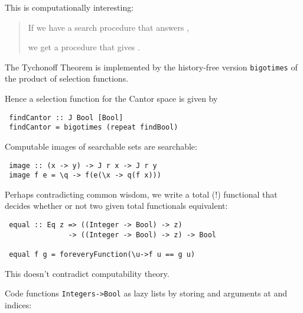 \documentclass%
[%
Screen4to3,
]{foils}
\begin{document}

\begin{quote}
\end{quote}

This is computationally interesting:
\begin{quote}
  If we have a search procedure that answers 
  ,

  we get a procedure that gives  .
\end{quote}


The Tychonoff Theorem is
implemented by the history-free version \verb+bigotimes+ of the
product of selection functions. 

\vfill

Hence a selection function for the
Cantor space is given by
\begin{verbatim}
 findCantor :: J Bool [Bool]
 findCantor = bigotimes (repeat findBool)
\end{verbatim}


Computable images of searchable sets are searchable:
\begin{verbatim}
 image :: (x -> y) -> J r x -> J r y
 image f e = \q -> f(e(\x -> q(f x)))
\end{verbatim}


Perhaps contradicting common wisdom, we write a
total (!) functional that decides whether or not two given total
functionals equivalent:

\vfill

\begin{verbatim}
 equal :: Eq z => ((Integer -> Bool) -> z) 
               -> ((Integer -> Bool) -> z) -> Bool 

 equal f g = foreveryFunction(\u->f u == g u)
\end{verbatim}

\vfill

This doesn't contradict computability theory.


 Code functions \verb+Integers->Bool+ as lazy
lists by storing  and 
arguments at  and  indices:
\end{document}
